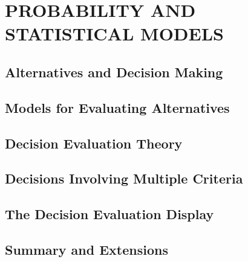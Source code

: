 \chapter{PROBABILITY AND STATISTICAL MODELS}\label{chap:10}

\section{Alternatives and Decision Making}


\section{Models for Evaluating Alternatives}


\section{Decision Evaluation Theory}


\section{Decisions Involving Multiple Criteria}


\section{The Decision Evaluation Display}


\section{Summary and Extensions}


\begin{exercises}
    \begin{exercise}
    \label{sea-10-1}
    
    \end{exercise}
    \begin{solution}
    \end{solution}

\end{exercises}
